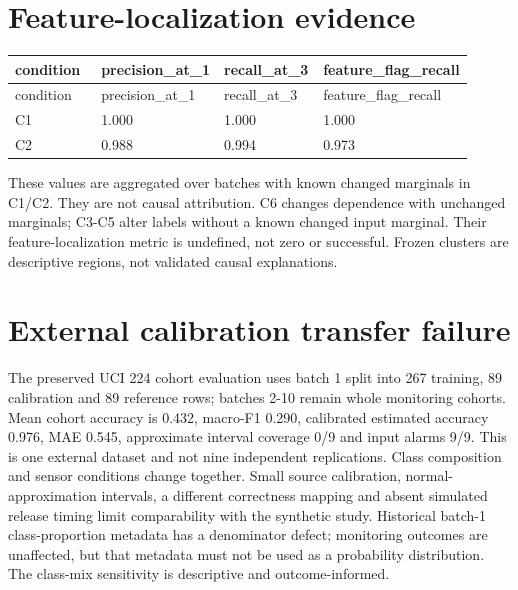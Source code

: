 \documentclass[11pt,a4paper]{article}
\begin{document}
\section{Feature-localization evidence}

\begingroup\scriptsize
\begin{longtable}{p{0.2275\linewidth}p{0.2275\linewidth}p{0.2275\linewidth}p{0.2275\linewidth}}
\toprule
condition & precision\_\allowbreak{}at\_\allowbreak{}1 & recall\_\allowbreak{}at\_\allowbreak{}3 & feature\_\allowbreak{}flag\_\allowbreak{}recall \\
\midrule
\endfirsthead
\toprule
condition & precision\_\allowbreak{}at\_\allowbreak{}1 & recall\_\allowbreak{}at\_\allowbreak{}3 & feature\_\allowbreak{}flag\_\allowbreak{}recall \\
\midrule
\endhead
C1 & 1.000 & 1.000 & 1.000 \\
C2 & 0.988 & 0.994 & 0.973 \\
\bottomrule
\end{longtable}
\endgroup

These values are aggregated over batches with known changed marginals in C1/C2. They are not causal attribution. C6 changes dependence with unchanged marginals; C3-C5 alter labels without a known changed input marginal. Their feature-localization metric is undefined, not zero or successful. Frozen clusters are descriptive regions, not validated causal explanations.\par

\section{External calibration transfer failure}

The preserved UCI 224 cohort evaluation uses batch 1 split into 267 training, 89 calibration and 89 reference rows; batches 2-10 remain whole monitoring cohorts. Mean cohort accuracy is 0.432, macro-F1 0.290, calibrated estimated accuracy 0.976, MAE 0.545, approximate interval coverage 0/9 and input alarms 9/9. This is one external dataset and not nine independent replications. Class composition and sensor conditions change together. Small source calibration, normal-approximation intervals, a different correctness mapping and absent simulated release timing limit comparability with the synthetic study. Historical batch-1 class-proportion metadata has a denominator defect; monitoring outcomes are unaffected, but that metadata must not be used as a probability distribution. The class-mix sensitivity is descriptive and outcome-informed.\par
\end{document}
